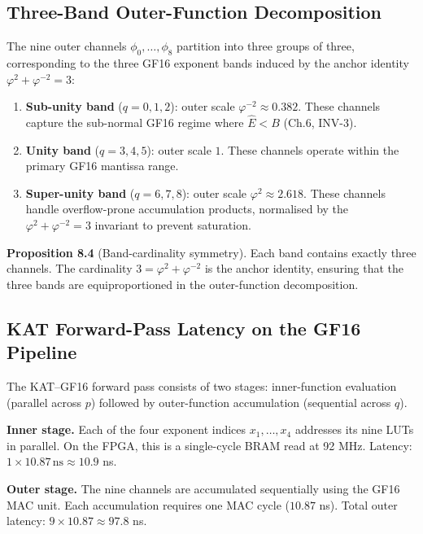 \subsection{Three-Band Outer-Function
Decomposition}\label{fa_23:three-band-outer}

The nine outer channels \(\phi_0, \ldots, \phi_8\)
partition into three groups of three, corresponding
to the three GF16 exponent bands induced by the
anchor identity
\(\varphi^2 + \varphi^{-2} = 3\):

\begin{enumerate}
\item \textbf{Sub-unity band} (\(q = 0, 1, 2\)):
outer scale \(\varphi^{-2} \approx 0.382\). These
channels capture the sub-normal GF16 regime where
\(\hat{E} < B\) (Ch.6, INV-3).
\item \textbf{Unity band} (\(q = 3, 4, 5\)):
outer scale \(1\). These channels operate within
the primary GF16 mantissa range.
\item \textbf{Super-unity band} (\(q = 6, 7, 8\)):
outer scale \(\varphi^{2} \approx 2.618\). These
channels handle overflow-prone accumulation
products, normalised by the
\(\varphi^{2} + \varphi^{-2} = 3\) invariant to
prevent saturation.
\end{enumerate}

\textbf{Proposition 8.4} (Band-cardinality
symmetry). Each band contains exactly three
channels. The cardinality \(3 = \varphi^2 +
\varphi^{-2}\) is the anchor identity, ensuring
that the three bands are equiproportioned in the
outer-function decomposition.

\subsection{KAT Forward-Pass Latency on the GF16
Pipeline}\label{fa_23:kat-forward-pass-latency}

The KAT--GF16 forward pass consists of two stages:
inner-function evaluation (parallel across \(p\))
followed by outer-function accumulation (sequential
across \(q\)).

\textbf{Inner stage.} Each of the four exponent
indices \(x_1, \ldots, x_4\) addresses its
nine LUTs in parallel. On the FPGA, this is a
single-cycle BRAM read at 92 MHz. Latency:
\(1 \times 10.87\,\text{ns} \approx 10.9\) ns.

\textbf{Outer stage.} The nine channels are
accumulated sequentially using the GF16 MAC unit.
Each accumulation requires one MAC cycle
(\(10.87\) ns). Total outer latency:
\(9 \times 10.87 \approx 97.8\) ns.

